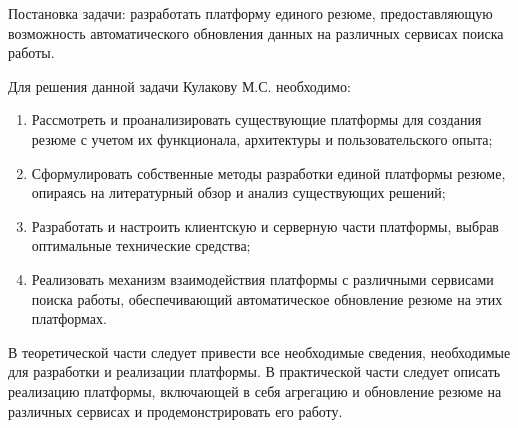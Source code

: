 \documentclass[master, och, assignment]{SCWorks}
\begin{document}


\maketitle

\secNumbering






Постановка задачи: разработать платформу единого резюме, предоставляющую возможность автоматического обновления данных на различных сервисах поиска работы. 

Для решения данной задачи Кулакову М.С. необходимо:
\begin{enumerate}
    \item Рассмотреть и проанализировать существующие платформы для создания резюме с учетом их функционала, архитектуры и пользовательского опыта;
    \item Сформулировать собственные методы разработки единой платформы резюме, опираясь на литературный обзор и анализ существующих решений;
    \item Разработать и настроить клиентскую и серверную части платформы, выбрав оптимальные технические средства;
    \item Реализовать механизм взаимодействия платформы с различными сервисами поиска работы, обеспечивающий автоматическое обновление резюме на этих платформах.
\end{enumerate}

В теоретической части следует привести все необходимые сведения, необходимые для разработки и реализации платформы. В практической части следует описать реализацию платформы, включающей в себя агрегацию и обновление резюме на различных сервисах и продемонстрировать его работу. 

\signatureline
\end{document}
